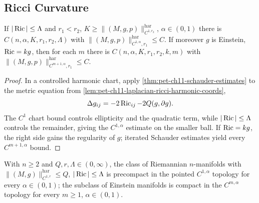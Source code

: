 \subsection{Ricci Curvature}

\begin{lemma}
  \label{lem:pet-ch11-anderson-ricci-harmonic-c1alpha-bound}

  If $|\operatorname{Ric}|\le\Lambda$ and $r_1<r_2$,
  $K\ge\|(M,g,p)\|^{\mathrm{har}}_{C^{1,r_2}}$, $\alpha\in(0,1)$ there is
  $C(n,\alpha,K,r_1,r_2,\Lambda)$ with
  $\|(M,g,p)\|^{\mathrm{har}}_{C^{1,\alpha},r_1}\le C$. If moreover $g$ is
  Einstein, $\operatorname{Ric}=kg$, then for each $m$ there is
  $C(n,\alpha,K,r_1,r_2,k,m)$ with
  $\|(M,g,p)\|^{\mathrm{har}}_{C^{m+1,\alpha},r_1}\le C$.
\end{lemma}
\begin{proof}
  \sketch
  In a controlled harmonic chart, apply \cref{thm:pet-ch11-schauder-estimates} to the metric equation from \cref{lem:pet-ch11-laplacian-ricci-harmonic-coords},
  \[
    \Delta g_{ij}=-2\operatorname{Ric}_{ij}-2Q(g,\partial g).
  \]
  The \(C^1\) chart bound controls ellipticity and the quadratic term, while \(|\operatorname{Ric}|\le\Lambda\) controls the remainder, giving the \(C^{1,\alpha}\) estimate on the smaller ball. If \(\operatorname{Ric}=kg\), the right side gains the regularity of \(g\); iterated Schauder estimates yield every \(C^{m+1,\alpha}\) bound.
\end{proof}


\begin{corollary}
  \label{cor:pet-ch11-ricci-bounded-precompact-c1alpha}

  With $n\ge2$ and $Q,r,\Lambda\in(0,\infty)$, the class of Riemannian
  $n$-manifolds with $\|(M,g)\|^{\mathrm{har}}_{C^{1,r}}\le Q$,
  $|\operatorname{Ric}|\le\Lambda$ is precompact in the pointed $C^{1,\alpha}$ topology for
  every $\alpha\in(0,1)$; the subclass of Einstein manifolds is compact in
  the $C^{m,\alpha}$ topology for every $m\ge1$, $\alpha\in(0,1)$.
\end{corollary}

